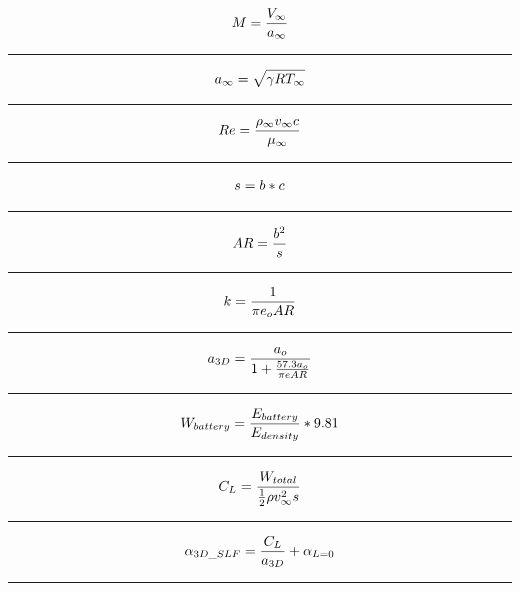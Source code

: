 \documentclass[12pt,A4paper]{article}
\begin{document}
	\begin{equation} \label{eq1} 
		M = \frac{V_\infty }{a_\infty} \\ 
	\end{equation}
	\hrule
	\vspace{0.1 in}
	\begin{equation}
		a_\infty = \sqrt{\gamma R T_\infty} \\
	\end{equation}
	\hrule
	\vspace{0.1 in}
	\begin{equation}
		Re = \frac{\rho_\infty v_\infty c}{\mu_\infty} \\
	\end{equation}
	\hrule
	\vspace{0.1 in}
	\begin{equation}
		s = b * c \\
	\end{equation}
	\hrule
	\vspace{0.1 in}
	\begin{equation}
		AR = \frac{b^2}{s} \\
	\end{equation}
	\hrule
	\vspace{0.1 in}
	\begin{equation}
		k = \frac{1}{\pi e_o AR} \\
	\end{equation}
	\hrule
	\vspace{0.1 in}
	\begin{equation}
		a_{3D} = \frac{a_o}{1 + \frac{57.3 a_o}{\pi e AR}} \\
	\end{equation}
	\hrule
	\vspace{0.1 in}
	\begin{equation}
		W_{battery} = \frac{E_{battery}}{E_{density}} *9.81 \\
	\end{equation}
	\hrule
	\vspace{0.1 in}
	\begin{equation}
		C_L = \frac{W_{total}}{\frac{1}{2} \rho  v_\infty^2  s} \\
	\end{equation}
	\hrule
	\vspace{0.1 in}
	\begin{equation}
		\alpha_{3D\_SLF} = \frac{C_L}{a_{3D}}+\alpha_{L=0} \\
	\end{equation}
	\hrule
	\vspace{0.1 in}
\end{document}
